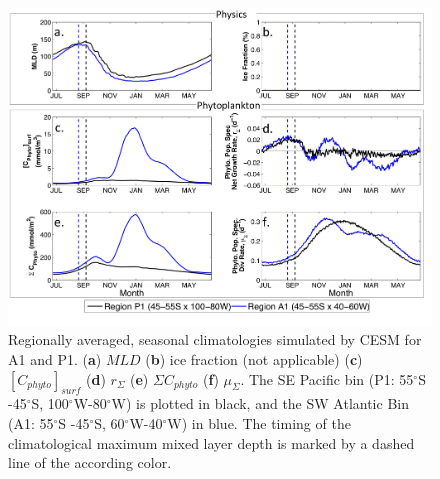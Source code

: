 \begin{figure}[!htbp]
\begin{adjustwidth}{-1in}{-1in}
 \centering
 \includegraphics[scale=.18]{figures/Ch2/Figure_3.jpg}
\end{adjustwidth}
\caption[Regionally averaged, seasonal climatologies simulated by CESM; A1 and P1]{Regionally averaged, seasonal climatologies simulated by CESM for A1 and P1. (\textbf{a}) $MLD$ (\textbf{b}) ice fraction (not applicable) (\textbf{c}) $[C_{phyto}]_{surf}$  (\textbf{d}) $r_\Sigma$ (\textbf{e}) $\Sigma C_{phyto}$ (\textbf{f}) $\mu_\Sigma$. The SE Pacific bin (P1: 55$^\circ$S -45$^\circ$S, 100$^\circ$W-80$^\circ$W) is plotted in black, and the SW Atlantic Bin (A1: 55$^\circ$S -45$^\circ$S, 60$^\circ$W-40$^\circ$W) in blue. The timing of the climatological maximum mixed layer depth is marked by a dashed line of the according color.}
\label{fig:Fig3}
\end{figure}



